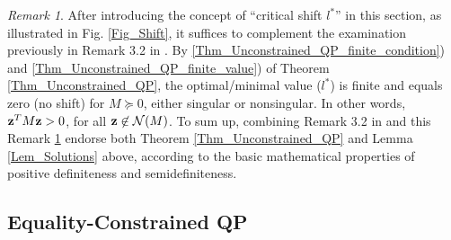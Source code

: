 \documentclass[9pt,twocolumn,twoside,lineno]{pnas-new-1}
\newcommand{\bfz}{{\bf z}}
\newcommand{\calN}{{\mathcal N}}
\theoremstyle{remark}
\newtheorem{remark}{Remark}[section]
\begin{document}
\begin{remark}
After introducing the concept of ``critical shift $l^*$'' in this section, as illustrated in Fig. \ref{Fig_Shift}, it suffices to complement the examination previously in Remark 3.2 in \cite{LiLiHs:20}. By \ref{Thm_Unconstrained_QP_finite_condition}) and \ref{Thm_Unconstrained_QP_finite_value}) of Theorem \ref{Thm_Unconstrained_QP}, the optimal/minimal value ($l^*$) is finite and equals zero (no shift) for $M\succeq 0$, either singular or nonsingular. In other words, $\bfz^TM\bfz>0$, for all $\bfz\not\in\calN(M)$. To sum up, combining Remark 3.2 in \cite{LiLiHs:20} and this Remark \ref{Rem_Thm_Unconstrained_QP_PSD} endorse both Theorem \ref{Thm_Unconstrained_QP} and Lemma \ref{Lem_Solutions} above, according to the basic mathematical properties of positive definiteness and semidefiniteness.
\label{Rem_Thm_Unconstrained_QP_PSD}
\end{remark}

\subsection{Equality-Constrained QP}
\label{Subsec_Equality_QP}
\end{document}
